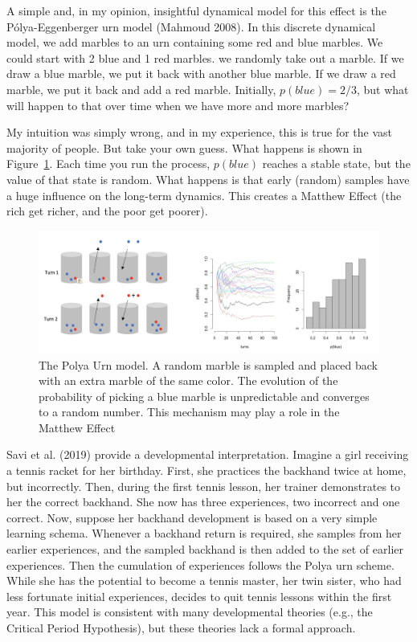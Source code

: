 \documentclass[
  letterpaper,
]{scrbook}
\begin{document}
A simple and, in my opinion, insightful dynamical model for this effect
is the Pólya-Eggenberger urn model (Mahmoud 2008). In this discrete
dynamical model, we add marbles to an urn containing some red and blue
marbles. We could start with 2 blue and 1 red marbles. we randomly take
out a marble. If we draw a blue marble, we put it back with another blue
marble. If we draw a red marble, we put it back and add a red marble.
Initially, \(p(blue) = 2/3\), but what will happen to that over time
when we have more and more marbles?

My intuition was simply wrong, and in my experience, this is true for
the vast majority of people. But take your own guess. What happens is
shown in Figure~\ref{fig-ch5-img12-old-60}. Each time you run the
process, \(p(blue)\) reaches a stable state, but the value of that state
is random. What happens is that early (random) samples have a huge
influence on the long-term dynamics. This creates a Matthew Effect (the
rich get richer, and the poor get poorer).

\begin{figure}

{\centering \includegraphics[width=6.26389in,height=\textheight]{media/ch5/image12.jpg}

}

\caption{\label{fig-ch5-img12-old-60}The Polya Urn model. A random
marble is sampled and placed back with an extra marble of the same
color. The evolution of the probability of picking a blue marble is
unpredictable and converges to a random number. This mechanism may play
a role in the Matthew Effect}

\end{figure}

Savi et al. (2019) provide a developmental interpretation. Imagine a
girl receiving a tennis racket for her birthday. First, she practices
the backhand twice at home, but incorrectly. Then, during the first
tennis lesson, her trainer demonstrates to her the correct backhand. She
now has three experiences, two incorrect and one correct. Now, suppose
her backhand development is based on a very simple learning schema.
Whenever a backhand return is required, she samples from her earlier
experiences, and the sampled backhand is then added to the set of
earlier experiences. Then the cumulation of experiences follows the
Polya urn scheme. While she has the potential to become a tennis master,
her twin sister, who had less fortunate initial experiences, decides to
quit tennis lessons within the first year. This model is consistent with
many developmental theories (e.g., the Critical Period Hypothesis), but
these theories lack a formal approach.
\end{document}
